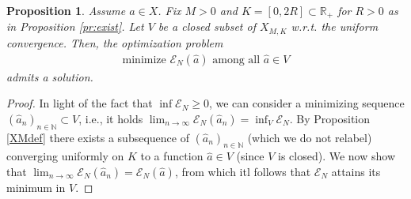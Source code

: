\documentclass[A4paper,11pt]{article}
\newtheorem{proposition}[theorem]{Proposition}
\theoremstyle{definition}
\newcommand{\N}{\mathbb{N}}
\newcommand{\R}{\mathbb{R}}
\newcommand{\cl}{\mathcal{L}}
\DeclareMathOperator{\supp}{supp}
\begin{document}
\begin{proposition}\label{ENmin}
Assume $a \in X$. Fix $M > 0$ and $K=[0,2R] \subset  \mathbb R_+$ for $R>0$ as in Proposition \ref{pr:exist}. Let $V$ be a closed subset of $X_{M,K}$ w.r.t. the uniform convergence. Then, the optimization problem
\begin{align*}
	\mbox{minimize } \mathcal E_N(\widehat a) \mbox{ among all } \widehat a \in V
\end{align*}
admits a solution.
\end{proposition}
\begin{proof}
In light of the fact that $\inf \mathcal E_N \geq 0$, we can consider a minimizing sequence $(\widehat a_n)_{n \in \N} \subset V$, i.e., it holds $\lim_{n \rightarrow \infty} \mathcal E_N(\widehat a_n) = \inf_{V} \mathcal E_N$. By Proposition \ref{XMdef} there exists a subsequence of $(\widehat a_n)_{n \in \N}$ (which we do not relabel) converging uniformly on $K$ to a function $\widehat a \in V$ (since $V$ is closed). We now show that $\lim_{n \rightarrow \infty} \mathcal E_N(\widehat a_n) = \mathcal  E_N(\widehat a)$, from which itl follows  that $\mathcal  E_N$ attains its minimum in $V$. 


\end{proof}
\end{document}

